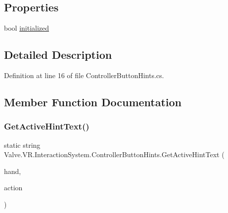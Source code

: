 \subsection*{Properties}
\begin{DoxyCompactItemize}
\item 
bool \mbox{\hyperlink{class_valve_1_1_v_r_1_1_interaction_system_1_1_controller_button_hints_a5d3509127dd1aac8bb1df1245861508f}{initialized}}
\end{DoxyCompactItemize}


\subsection{Detailed Description}


Definition at line 16 of file Controller\+Button\+Hints.\+cs.



\subsection{Member Function Documentation}
\mbox{\label{class_valve_1_1_v_r_1_1_interaction_system_1_1_controller_button_hints_a17c44960af993a2fe0341ef48c7ad727}} 
\subsubsection{\texorpdfstring{GetActiveHintText()}{GetActiveHintText()}}
{\footnotesize\ttfamily static string Valve.\+V\+R.\+Interaction\+System.\+Controller\+Button\+Hints.\+Get\+Active\+Hint\+Text (\begin{DoxyParamCaption}\item[{\mbox{\hyperlink{class_valve_1_1_v_r_1_1_interaction_system_1_1_hand}{Hand}}}]{hand,  }\item[{\mbox{\hyperlink{interface_valve_1_1_v_r_1_1_i_steam_v_r___action___in___source}{I\+Steam\+V\+R\+\_\+\+Action\+\_\+\+In\+\_\+\+Source}}}]{action }\end{DoxyParamCaption})\hspace{0.3cm}{\ttfamily [static]}}



